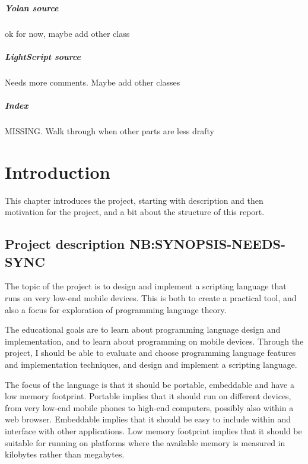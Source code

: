 \documentclass[11pt]{report}
\begin{document}
{\paragraph{Yolan source}
ok for now, maybe add other class
\paragraph{LightScript source}
Needs more comments. Maybe add other classes
\paragraph{Index}
MISSING. Walk through when other parts are less drafty
}
\chapter{Introduction}
This chapter introduces the project, starting with description and then motivation for the project, and a bit about the structure of this report.


\section{Project description NB:SYNOPSIS-NEEDS-SYNC}
    The topic of the project is to design and implement a scripting language
that runs on very low-end mobile devices. This is both to create a practical tool, and
also a focus for exploration of programming language theory. 

\begin{comment}
The motivation is that a scripting language makes it is easier to make applications for mobile 
devices, and that existing freely available scripting languages
are very limited, slow, or simply does not run on the low-end mobile devices.
\end{comment}

    The educational goals are to learn about programming language design and
implementation, and to learn about programming on mobile devices. Through the
project, I should be able to evaluate and choose programming language features
and implementation techniques, and design and implement a scripting language.

    The focus of the language is that it should be portable, embeddable and have
a low memory footprint. Portable implies that it should run on different devices,
from very low-end mobile phones to high-end computers, possibly also within a web browser. 
Embeddable implies that it should be easy to include within and interface with
other applications. Low memory footprint implies that it should be suitable for
running on platforms where the available memory is measured in kilobytes rather
than megabytes. 
\end{document}

